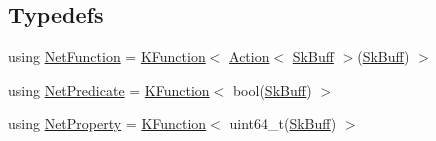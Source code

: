 \subsection*{Typedefs}
\begin{DoxyCompactItemize}
\item 
using \hyperlink{namespacepfq_1_1lang_a683f79c96532eb04a9750215004f6da3}{Net\+Function} = \hyperlink{structpfq_1_1lang_1_1KFunction}{K\+Function}$<$ \hyperlink{structpfq_1_1lang_1_1Action}{Action}$<$ \hyperlink{structpfq_1_1lang_1_1SkBuff}{Sk\+Buff} $>$(\hyperlink{structpfq_1_1lang_1_1SkBuff}{Sk\+Buff}) $>$
\item 
using \hyperlink{namespacepfq_1_1lang_ac239a78ab8b48b8248a19910fa06e25c}{Net\+Predicate} = \hyperlink{structpfq_1_1lang_1_1KFunction}{K\+Function}$<$ bool(\hyperlink{structpfq_1_1lang_1_1SkBuff}{Sk\+Buff}) $>$
\item 
using \hyperlink{namespacepfq_1_1lang_a57429ebee2d34e07e521ffd16d714d89}{Net\+Property} = \hyperlink{structpfq_1_1lang_1_1KFunction}{K\+Function}$<$ uint64\+\_\+t(\hyperlink{structpfq_1_1lang_1_1SkBuff}{Sk\+Buff}) $>$
\end{DoxyCompactItemize}
